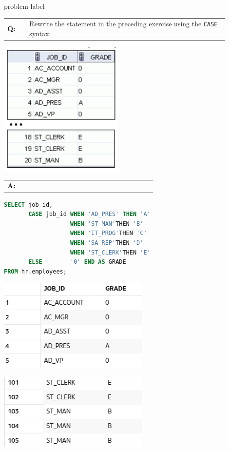 \newpage
\begin{problem}{}{problem-label}

\begin{tabular}{@{}l p{0.9\linewidth}@{}}
  \textbf{Q:} & Rewrite the statement in the preceding exercise using the \texttt{CASE} syntax.
\end{tabular}

\begin{center}
  \includegraphics[scale=0.8]{images/c4q6.png}
\end{center}

\begin{tabular}{@{}l p{0.9\linewidth}@{}}
  \textbf{A:} & 
\end{tabular}


\begin{lstlisting}[language=SQL]
SELECT job_id, 
       CASE job_id WHEN 'AD_PRES' THEN 'A'
                   WHEN 'ST_MAN'THEN 'B'
                   WHEN 'IT_PROG'THEN 'C'
                   WHEN 'SA_REP'THEN 'D'
                   WHEN 'ST_CLERK'THEN 'E'
       ELSE        '0' END AS GRADE
FROM hr.employees;
\end{lstlisting}

\vspace{1em}

\begin{center}
  \includegraphics[scale=0.7]{images/c4a5-1.png}
\end{center}
\begin{center}
    \includegraphics[scale=0.7]{images/c4a5-2.png}
\end{center}
\end{problem}


